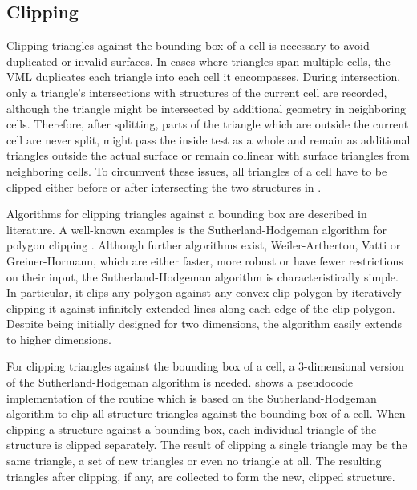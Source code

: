 \subsection{Clipping}
\label{sec:clipping}

Clipping triangles against the bounding box of a cell is necessary to avoid duplicated or invalid surfaces.
In cases where triangles span multiple cells, the VML duplicates each triangle into each cell it encompasses.
During intersection, only a triangle's intersections with structures of the current cell are recorded, although the triangle might be intersected by additional geometry in neighboring cells.
Therefore, after splitting, parts of the triangle which are outside the current cell are never split, might pass the inside test as a whole and remain as additional triangles outside the actual surface or remain collinear with surface triangles from neighboring cells.
To circumvent these issues, all triangles of a cell have to be clipped either before or after intersecting the two structures in .

Algorithms for clipping triangles against a bounding box are described in literature.
A well-known examples is the Sutherland-Hodgeman algorithm for polygon clipping \cite{polygon_clipping}.
Although further algorithms exist, \eg Weiler-Artherton, Vatti or Greiner-Hormann, which are either faster, more robust or have fewer restrictions on their input, the Sutherland-Hodgeman algorithm is characteristically simple.
In particular, it clips any polygon against any convex clip polygon by iteratively clipping it against infinitely extended lines along each edge of the clip polygon.
Despite being initially designed for two dimensions, the algorithm easily extends to higher dimensions.

For clipping triangles against the bounding box of a cell, a 3-dimensional version of the Sutherland-Hodgeman algorithm is needed.
 shows a pseudocode implementation of the  routine which is based on the Sutherland-Hodgeman algorithm to clip all structure triangles against the bounding box of a cell.
%
When clipping a structure against a bounding box, each individual triangle of the structure is clipped separately.
The result of clipping a single triangle may be the same triangle, a set of new triangles or even no triangle at all.
The resulting triangles after clipping, if any, are collected to form the new, clipped structure.

